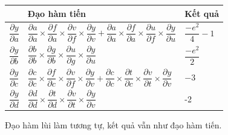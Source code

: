 \documentclass[final,letterpaper,twoside,12pt]{report}
\begin{document}
\begin{itemize}
	      \begin{table}[h]
		      \centering
		      \renewcommand{\arraystretch}{2}
		      \begin{tabular}{|p{0.5cm}|p{8cm}|p{2cm}|}
			      \hline
			                                       & \textbf{Đạo hàm tiến}                                                                                                                                                                                                                                                                                  & Kết quả             \\
			      \hline
			      $\dfrac{\partial y}{\partial a}$ & $\dfrac{\partial a }{\partial a} \times \dfrac{\partial f}{\partial a} \times \dfrac{\partial v}{\partial f} \times \dfrac{\partial y}{\partial v} +\dfrac{\partial a}{\partial a} \times \dfrac{\partial f}{\partial a} \times \dfrac{\partial u}{\partial f} \times \dfrac{\partial y}{\partial u} $ & $\dfrac{-e^2}{4}-1$ \\
			      \hline
			      $\dfrac{\partial y}{\partial b}$ & $\dfrac{\partial b }{\partial b} \times \dfrac{\partial g}{\partial b} \times \dfrac{\partial u}{\partial g} \times \dfrac{\partial y}{\partial u} $                                                                                                                                                   & $\dfrac{-e^2}{2}$   \\
			      \hline
			      $\dfrac{\partial y}{\partial c}$ & $\dfrac{\partial c}{\partial c} \times \dfrac{\partial f}{\partial c} \times \dfrac{\partial v}{\partial f} \times \dfrac{\partial y}{\partial v} +\dfrac{\partial c}{\partial c} \times \dfrac{\partial t}{\partial c} \times \dfrac{\partial v}{\partial t} \times \dfrac{\partial y}{\partial v}$   & $-3$                \\
			      \hline
			      $\dfrac{\partial y}{\partial d}$ & $\dfrac{\partial d }{\partial d} \times \dfrac{\partial t}{\partial d} \times \dfrac{\partial v}{\partial t} \times \dfrac{\partial y}{\partial v} $                                                                                                                                                   & -2                  \\
			      \hline
		      \end{tabular}
	      \end{table}

	      Đạo hàm lùi làm tương tự, kết quả vẫn như đạo hàm tiến.
\end{itemize}
\end{document}
